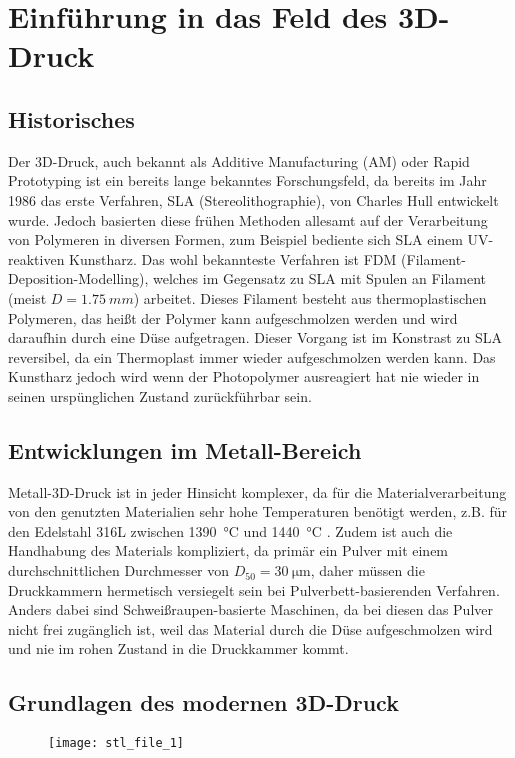 \documentclass[../main.tex]{subfiles}
\begin{document}
\section{Einführung in das Feld des 3D-Druck}
\subsection{Historisches}
Der 3D-Druck, auch bekannt als Additive Manufacturing (AM) oder Rapid Prototyping ist ein bereits lange bekanntes Forschungsfeld, da bereits im Jahr 1986 das erste Verfahren, SLA (Stereolithographie), von Charles Hull entwickelt wurde. Jedoch basierten diese frühen Methoden allesamt auf der Verarbeitung von Polymeren in diversen Formen, zum Beispiel bediente sich SLA einem UV-reaktiven Kunstharz. Das wohl bekannteste Verfahren ist FDM (Filament-Deposition-Modelling), welches im Gegensatz zu SLA mit Spulen an Filament (meist $D=\qty{1.75}{mm}$) arbeitet. Dieses Filament besteht aus thermoplastischen Polymeren, das heißt der Polymer kann aufgeschmolzen werden und wird daraufhin durch eine Düse aufgetragen. Dieser Vorgang ist im Konstrast zu SLA reversibel, da ein Thermoplast immer wieder aufgeschmolzen werden kann.\parencite{BHATIA20231060} Das Kunstharz jedoch wird wenn der Photopolymer ausreagiert hat nie wieder in seinen urspünglichen Zustand zurückführbar sein.\parencite{FACUNDO_1}
\subsection{Entwicklungen im Metall-Bereich}
Metall-3D-Druck ist in jeder Hinsicht komplexer, da für die Materialverarbeitung von den genutzten Materialien sehr hohe Temperaturen benötigt werden, z.B. für den Edelstahl 316L zwischen \qty{1390}{\celsius} und \qty{1440}{\degreeCelsius} \parencite{610LSTEEL}. Zudem ist auch die Handhabung des Materials kompliziert, da primär ein Pulver mit einem durchschnittlichen Durchmesser von $D_{50}=\SI{30}{\micro\meter}$\parencite[~S.3]{ZAKRZEWSKI2020115}, daher müssen die Druckkammern hermetisch versiegelt sein bei Pulverbett-basierenden Verfahren.
Anders dabei sind Schweißraupen-basierte Maschinen, da bei diesen das Pulver nicht frei zugänglich ist, weil das Material durch die Düse aufgeschmolzen wird und nie im rohen Zustand in die Druckkammer kommt.

\subsection{Grundlagen des modernen 3D-Druck}
\begin{figure}[h]
\begin{center}
	\texttt{[image: stl\_file\_1]}
	\label{img:stl_1}
\end{center}
\end{figure}	
\end{document}
